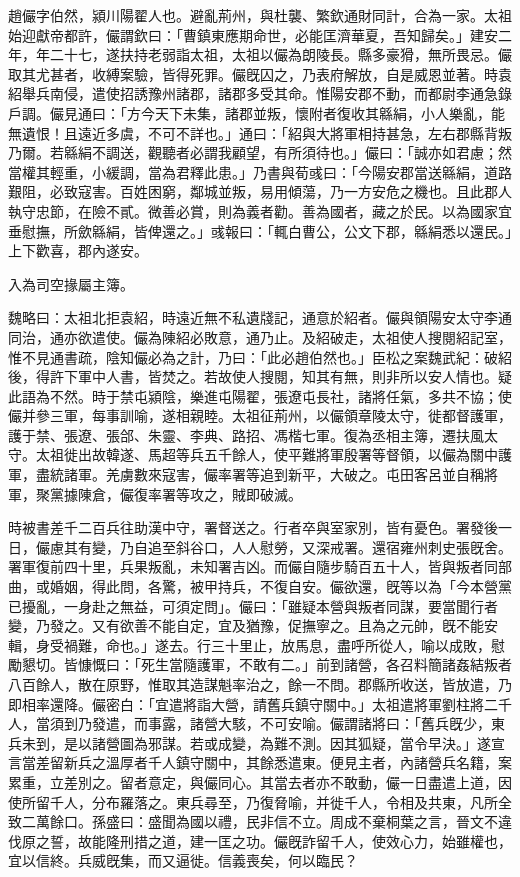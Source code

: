 
\begin{pinyinscope}
趙儼字伯然，潁川陽翟人也。避亂荊州，與杜襲、繁欽通財同計，合為一家。太祖始迎獻帝都許，儼謂欽曰：「曹鎮東應期命世，必能匡濟華夏，吾知歸矣。」建安二年，年二十七，遂扶持老弱詣太祖，太祖以儼為朗陵長。縣多豪猾，無所畏忌。儼取其尤甚者，收縛案驗，皆得死罪。儼旣囚之，乃表府解放，自是威恩並著。時袁紹舉兵南侵，遣使招誘豫州諸郡，諸郡多受其命。惟陽安郡不動，而都尉李通急錄戶調。儼見通曰：「方今天下未集，諸郡並叛，懷附者復收其緜絹，小人樂亂，能無遺恨！且遠近多虞，不可不詳也。」通曰：「紹與大將軍相持甚急，左右郡縣背叛乃爾。若緜絹不調送，觀聽者必謂我顧望，有所須待也。」儼曰：「誠亦如君慮；然當權其輕重，小緩調，當為君釋此患。」乃書與荀彧曰：「今陽安郡當送緜絹，道路艱阻，必致寇害。百姓困窮，鄰城並叛，易用傾蕩，乃一方安危之機也。且此郡人執守忠節，在險不貳。微善必賞，則為義者勸。善為國者，藏之於民。以為國家宜垂慰撫，所歛緜絹，皆俾還之。」彧報曰：「輒白曹公，公文下郡，緜絹悉以還民。」上下歡喜，郡內遂安。

入為司空掾屬主簿。

魏略曰：太祖北拒袁紹，時遠近無不私遺牋記，通意於紹者。儼與領陽安太守李通同治，通亦欲遣使。儼為陳紹必敗意，通乃止。及紹破走，太祖使人搜閱紹記室，惟不見通書疏，陰知儼必為之計，乃曰：「此必趙伯然也。」臣松之案魏武紀：破紹後，得許下軍中人書，皆焚之。若故使人搜閱，知其有無，則非所以安人情也。疑此語為不然。時于禁屯潁陰，樂進屯陽翟，張遼屯長社，諸將任氣，多共不協；使儼并參三軍，每事訓喻，遂相親睦。太祖征荊州，以儼領章陵太守，徙都督護軍，護于禁、張遼、張郃、朱靈、李典、路招、馮楷七軍。復為丞相主簿，遷扶風太守。太祖徙出故韓遂、馬超等兵五千餘人，使平難將軍殷署等督領，以儼為關中護軍，盡統諸軍。羌虜數來寇害，儼率署等追到新平，大破之。屯田客呂並自稱將軍，聚黨據陳倉，儼復率署等攻之，賊即破滅。

時被書差千二百兵往助漢中守，署督送之。行者卒與室家別，皆有憂色。署發後一日，儼慮其有變，乃自追至斜谷口，人人慰勞，又深戒署。還宿雍州刺史張旣舍。署軍復前四十里，兵果叛亂，未知署吉凶。而儼自隨步騎百五十人，皆與叛者同部曲，或婚姻，得此問，各驚，被甲持兵，不復自安。儼欲還，旣等以為「今本營黨已擾亂，一身赴之無益，可須定問」。儼曰：「雖疑本營與叛者同謀，要當聞行者變，乃發之。又有欲善不能自定，宜及猶豫，促撫寧之。且為之元帥，旣不能安輯，身受禍難，命也。」遂去。行三十里止，放馬息，盡呼所從人，喻以成敗，慰勵懇切。皆慷慨曰：「死生當隨護軍，不敢有二。」前到諸營，各召料簡諸姦結叛者八百餘人，散在原野，惟取其造謀魁率治之，餘一不問。郡縣所收送，皆放遣，乃即相率還降。儼密白：「宜遣將詣大營，請舊兵鎮守關中。」太祖遣將軍劉柱將二千人，當須到乃發遣，而事露，諸營大駭，不可安喻。儼謂諸將曰：「舊兵旣少，東兵未到，是以諸營圖為邪謀。若或成變，為難不測。因其狐疑，當令早決。」遂宣言當差留新兵之溫厚者千人鎮守關中，其餘悉遣東。便見主者，內諸營兵名籍，案累重，立差別之。留者意定，與儼同心。其當去者亦不敢動，儼一日盡遣上道，因使所留千人，分布羅落之。東兵尋至，乃復脅喻，并徙千人，令相及共東，凡所全致二萬餘口。孫盛曰：盛聞為國以禮，民非信不立。周成不棄桐葉之言，晉文不違伐原之誓，故能隆刑措之道，建一匡之功。儼旣詐留千人，使效心力，始雖權也，宜以信終。兵威旣集，而又逼徙。信義喪矣，何以臨民？


\end{pinyinscope}
